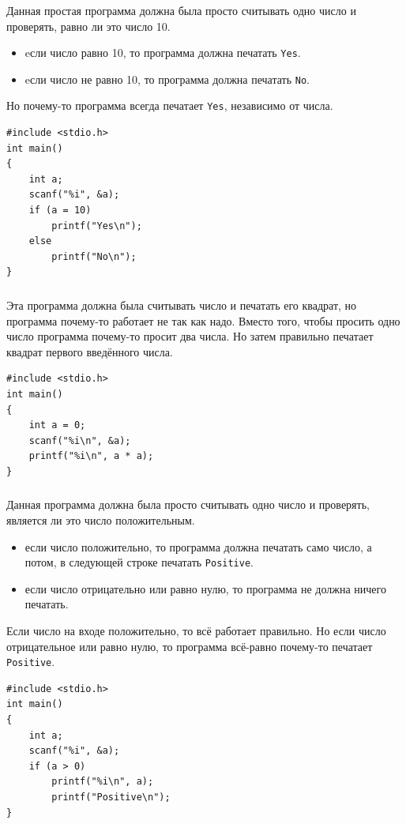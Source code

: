 \documentclass[10pt]{article}
\begin{document}
\subsubsection{}
Данная простая программа должна была просто считывать одно число и проверять, равно ли это число 10.
\begin{itemize}
\item eсли число равно 10, то программа должна печатать \texttt{Yes}.
\item eсли число не равно 10, то программа должна печатать \texttt{No}.
\end{itemize}
Но почему-то программа всегда печатает \texttt{Yes}, независимо от числа.
\begin{lstlisting}
#include <stdio.h>
int main()
{
    int a;
    scanf("%i", &a);
    if (a = 10)
        printf("Yes\n");
    else
        printf("No\n");
}
\end{lstlisting}

\subsubsection{}
Эта программа должна была считывать число и печатать его квадрат, но программа почему-то работает не так как надо. Вместо того, чтобы просить одно число программа почему-то просит два числа.
Но затем правильно печатает квадрат первого введённого числа.
\begin{lstlisting}
#include <stdio.h>
int main()
{
    int a = 0;
    scanf("%i\n", &a);
    printf("%i\n", a * a);
}
\end{lstlisting}


\subsubsection{}
Данная программа должна была просто считывать одно число и проверять, является ли это число положительным.  
\begin{itemize}
\item если число положительно, то программа должна печатать само число, а потом, в следующей строке печатать \texttt{Positive}.
\item если число отрицательно или равно нулю, то программа не должна ничего печатать.
\end{itemize}
Если число на входе положительно, то всё работает правильно.
Но если число отрицательное или равно нулю, то программа всё-равно почему-то печатает \texttt{Positive}.
\begin{lstlisting}
#include <stdio.h>
int main()
{
    int a;
    scanf("%i", &a);
    if (a > 0)
        printf("%i\n", a);
        printf("Positive\n");
}
\end{lstlisting}
\end{document}
